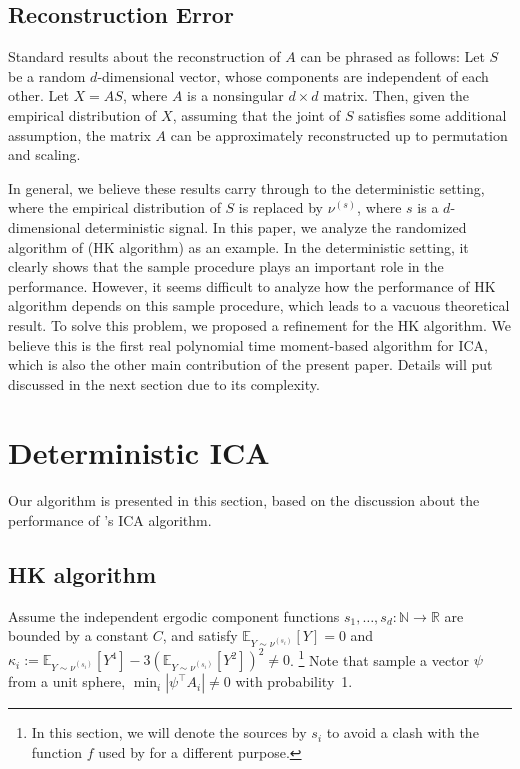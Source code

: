 \documentclass[twoside]{article}
\newcommand{\E}{\mathbb{E}}
\newcommand{\ra}{\rightarrow}
\newcommand{\real}{\mathbb{R}}
\renewcommand{\natural}{\mathbb{N}}
\theoremstyle{definition}
\begin{document}
\subsection{Reconstruction Error}
\label{subsec:HowDifficult}

Standard results about the reconstruction of $A$ can be phrased as follows:
Let $S$ be a random $d$-dimensional vector, whose components are independent of each other.
Let $X = A S$, where $A$ is a nonsingular $d\times d$ matrix. Then, given the empirical distribution of $X$, assuming that the joint of $S$ satisfies some additional assumption, the matrix $A$ can be approximately reconstructed up to permutation and scaling.

In general, we believe these results carry through to the deterministic setting, where the empirical distribution of $S$ is replaced by $\nu^{(s)}$, where $s$ is a $d$-dimensional deterministic signal.
In this paper, we analyze the randomized algorithm of \citep{DHsu2012}(HK algorithm) as an example. 
In the deterministic setting, it clearly shows that the sample procedure plays an important role in the performance.
However, it seems difficult to analyze how the performance of HK algorithm depends on this sample procedure, which leads to a vacuous theoretical result.
To solve this problem, we proposed a refinement for the HK algorithm. 
We believe this is the first real polynomial time moment-based algorithm for ICA, which is also the other main contribution of the present paper. 
Details will put discussed in the next section due to its complexity.  

\section{Deterministic ICA}
\label{sec:DICA}
Our algorithm is presented in this section, based on the discussion about the performance of \citet{hsu2013learning}'s ICA algorithm.

\subsection{HK algorithm}
\label{subsec:HKalg}
Assume the independent ergodic component functions $s_1,\ldots,s_d:\natural \ra \real$ are bounded by a constant $C$, and satisfy $\E_{Y\sim\nu^{(s_i)}}[Y]=0$ and $\kappa_i := \E_{Y\sim \nu^{(s_i)}}[Y^4] - 3\left(\E_{Y\sim \nu^{(s_i)}}[Y^2]\right)^2\neq 0$.
\footnote{In this section, we will denote the sources by $s_i$ to avoid a clash with the function $f$ used by  \citet{DHsu2012} for a different purpose.}
Note that sample a vector $\psi$ from a unit sphere, $\min_i |\psi^{\top}A_i|\neq 0$ with probability~1.  
\end{document}
